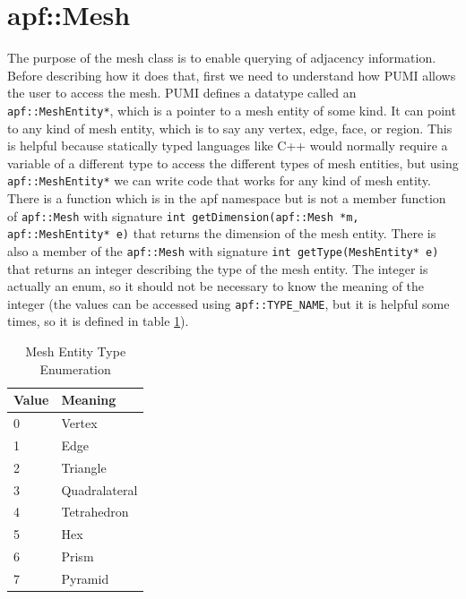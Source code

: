 \documentclass[12pt]{article}
\newcommand{\ttt}{\texttt}
\begin{document}
\section{apf::Mesh}
The purpose of the mesh class is to enable querying of adjacency information.  
Before describing how it does that, first we need to understand how PUMI allows the user to access the mesh.
PUMI defines a datatype called an \ttt{apf::MeshEntity*}, which is a pointer to a mesh entity of some kind.  It can point to any kind of mesh entity, which is to say any vertex, edge, face, or region.
This is helpful because statically typed languages like C++ would normally require a variable of a different type to access the different types of mesh entities, but using \ttt{apf::MeshEntity*} we can write code that works for any kind of mesh entity.
There is a function which is in the apf namespace but is not a member function of \ttt{apf::Mesh} with signature  
\newline
\newline
\noindent\texttt{int getDimension(apf::Mesh *m, apf::MeshEntity* e)} 
\newline
\newline
\noindent that returns the dimension of the mesh entity.  
There is also a member of the \ttt{apf::Mesh} with signature 
\newline
\newline
\noindent\ttt{int getType(MeshEntity* e)} 
\newline
\newline
\noindent that returns an integer describing the type of the mesh entity.  
The integer is actually an enum, so it should not be necessary to know the meaning of the integer (the values can be accessed using \ttt{apf::TYPE\_NAME}, but it is helpful some times, so it is defined in table \ref{tab:type_enum}).


\begin{table}[h]
\centering
\begin{tabular}{@{}|l|l|@{}}
\toprule
Value & Meaning       \\ \midrule
0     & Vertex        \\ \midrule
1     & Edge          \\ \midrule
2     & Triangle      \\ \midrule
3     & Quadralateral \\ \midrule
4     & Tetrahedron   \\ \midrule
5     & Hex           \\ \midrule
6     & Prism         \\ \midrule
7     & Pyramid       \\ \bottomrule
\end{tabular}
\caption{Mesh Entity Type Enumeration}
\label{tab:type_enum}
\end{table}
\end{document}
